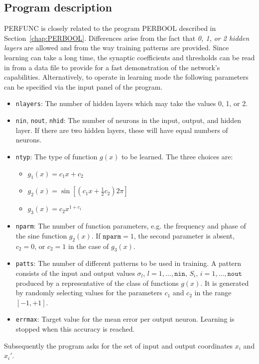 \subsection{Program description}
PERFUNC is closely related to the program PERBOOL described in Section~\ref{chap:PERBOOL}. Differences arise from the fact that \emph{0, 1, or 2 hidden layers} are allowed and from the way training patterns are provided. Since learning can take a long time, the synaptic coefficients and thresholds can be read in from a data file to provide for a fast demonstration of the network's capabilities. Alternatively, to operate in learning mode the following parameters can be specified via the input panel of the program.
\begin{itemize}
\item \texttt{nlayers}: The number of hidden layers which may take the values 0, 1, or 2.
\item \texttt{nin}, \texttt{nout}, \texttt{nhid}: The number of neurons in the input, output, and hidden layer. If there are two hidden layers, these will have equal numbers of neurons.
\item \texttt{ntyp}: The type of function $g(x)$ to be learned. The three choices are:
	\begin{itemize}
	\item $\displaystyle g_1(x)=c_1x+c_2$
	\item $\displaystyle g_2(x)=\sin{\left[\left(c_1x+\frac{1}{2}c_2\right)2\pi\right]}$
	\item $\displaystyle g_3(x)=c_2x^{1+c_1}$
	\end{itemize}
\item \texttt{nparm}: The number of function parameters, e.g. the frequency and phase of the sine function $g_2(x)$. If $\texttt{nparm}=1$, the second parameter is absent, $c_2=0$, or $c_2=1$ in the case of $g_3(x)$.
\item \texttt{patts}: The number of different patterns to be used in training. A pattern consists of the input and output values $\sigma_l$, $l=1,\ldots,\texttt{nin}$, $S_i$, $i=1,\ldots,\texttt{nout}$ produced by a representative of the class of functions $g(x)$. It is generated by randomly selecting values for the parameters $c_1$ and $c_2$ in the range $[-1,+1]$.
\item \texttt{errmax}: Target value for the mean error per output neuron. Learning is stopped when this accuracy is reached.
\end{itemize}
Subsequently the program asks for the set of input and output coordinates $x_i$ and $x_i'$.

